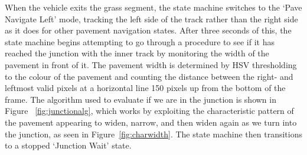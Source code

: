 \documentclass[titlepage, twocolumn]{article}
\begin{document}
            When the vehicle exits the grass segment, the state machine switches to the `Pave Navigate Left' mode, tracking the left side of the track rather than the right side as it does for other pavement navigation states. After three seconds of this, the state machine begins attempting to go through a procedure to see if it has reached the junction with the inner track by monitoring the width of the pavement in front of it. The pavement width is determined by HSV thresholding to the colour of the pavement and counting the distance between the right- and leftmost valid pixels at a horizontal line 150 pixels up from the bottom of the frame. The algorithm used to evaluate if we are in the junction is shown in Figure ~\ref{fig:junctionalg}, which works by exploiting the characteristic pattern of the pavement appearing to widen, narrow, and then widen again as we turn into the junction, as seen in Figure~\ref{fig:charwidth}. The state machine then transitions to a stopped `Junction Wait' state. 
\end{document}
